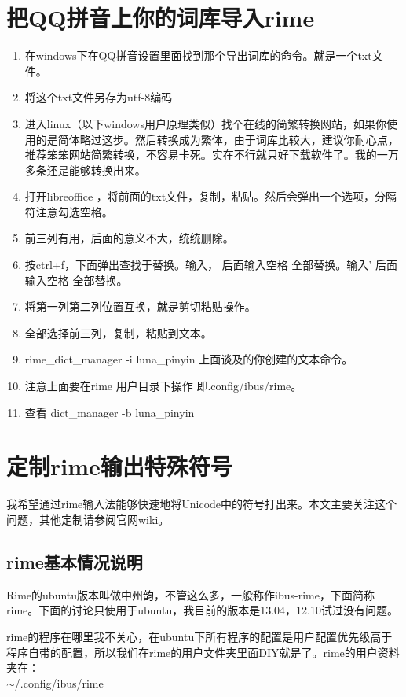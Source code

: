 \section{把QQ拼音上你的词库导入rime}
\begin{enumerate}
\item 在windows下在QQ拼音设置里面找到那个导出词库的命令。就是一个txt文件。
\item 将这个txt文件另存为utf-8编码
\item 进入linux（以下windows用户原理类似）找个在线的简繁转换网站，如果你使用的是简体略过这步。然后转换成为繁体，由于词库比较大，建议你耐心点，推荐笨笨网站简繁转换，不容易卡死。实在不行就只好下载软件了。我的一万多条还是能够转换出来。
\item 打开libreoffice ，将前面的txt文件，复制，粘贴。然后会弹出一个选项，分隔符注意勾选空格。
\item 前三列有用，后面的意义不大，统统删除。
\item 按ctrl+f，下面弹出查找于替换。输入，  后面输入空格   全部替换。输入'     后面输入空格   全部替换。
\item 将第一列第二列位置互换，就是剪切粘贴操作。
\item 全部选择前三列，复制，粘贴到文本。
\item rime\_dict\_manager  -i luna\_pinyin   上面谈及的你创建的文本命令。
\item 注意上面要在rime 用户目录下操作  即.config/ibus/rime。
\item 查看   dict\_manager -b luna\_pinyin  
\end{enumerate}


\section{定制rime输出特殊符号}
\begin{fancycolorbox}
我希望通过rime输入法能够快速地将Unicode中的符号打出来。本文主要关注这个问题，其他定制请参阅官网wiki。
\end{fancycolorbox}


\subsection{rime基本情况说明}
Rime的ubuntu版本叫做中州韵，不管这么多，一般称作ibus-rime，下面简称rime。下面的讨论只使用于ubuntu，我目前的版本是13.04，12.10试过没有问题。

rime的程序在哪里我不关心，在ubuntu下所有程序的配置是用户配置优先级高于程序自带的配置，所以我们在rime的用户文件夹里面DIY就是了。rime的用户资料夹在：\\
$ \sim $/.config/ibus/rime


